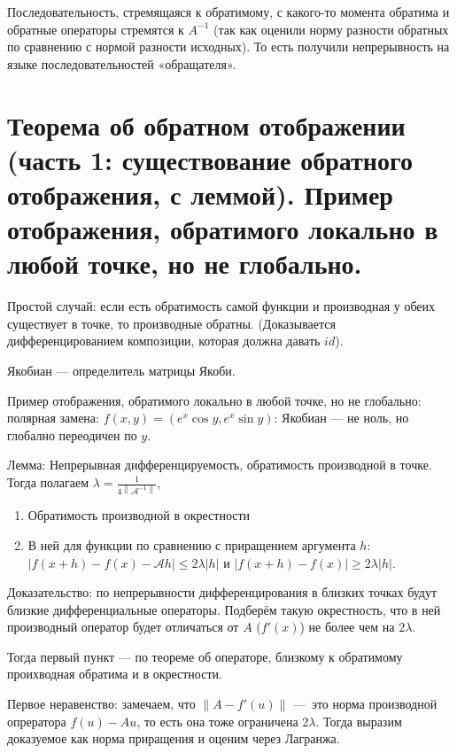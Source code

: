 \documentclass[12pt, a4paper]{article}
\begin{document}
    Последовательность, стремящаяся к обратимому, с какого-то момента обратима и обратные операторы стремятся к $A^{-1}$ (так как оценили норму разности обратных по сравнению с нормой разности исходных).
    То есть получили непрерывность на языке последовательностей «обращателя».


\section{Теорема об обратном отображении (часть 1: существование обратного отображения, с леммой). 
        Пример отображения, обратимого локально в любой точке, но не глобально.}

    Простой случай: если есть обратимость самой функции и производная у обеих существует в точке, то производные обратны. 
    (Доказывается дифференцированием композиции, которая должна давать $id$).

    Якобиан — определитель матрицы Якоби.

    Пример отображения, обратимого локально в любой точке, но не глобально: полярная замена: $f(x, y) = (e^x \cos y, e^x \sin y)$: Якобиан — не ноль, но глобално переодичен по $y$.

    \splitdoc

    Лемма: Непрерывная дифференцируемость, обратимость производной в точке. Тогда полагаем $\lambda = \frac{1}{4 \left\| \mathcal{A}^{-1} \right\|}$,

    \begin{enumerate}
        \item Обратимость производной в окрестности
        \item В ней для функции по сравнению с приращением аргумента $h$: $|f(x+h)-f(x)-\mathcal{A} h| \leqslant 2 \lambda|h|$ и $|f(x+h)-f(x)| \geqslant 2 \lambda|h|$.
    \end{enumerate}

    Доказательство: по непрерывности дифференцирования в близких точках будут близкие дифференциальные операторы.
    Подберём такую окрестность, что в ней производный оператор будет отличаться от $A$ ($f'(x)$) не более чем на $2 \lambda$.

    Тогда первый пункт — по теореме об операторе, близкому к обратимому проихводная обратима и в окрестности.

    Первое неравенство: замечаем, что $\left\| A - f'(u) \right\|$ — это норма производной опрератора $f(u) - Au$, то есть она тоже ограничена $2 \lambda$.
    Тогда выразим доказуемое как норма приращения и оценим через Лагранжа.
\end{document}
